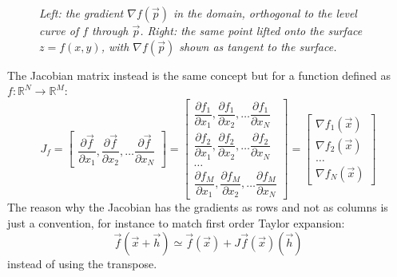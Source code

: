 \documentclass[12pt,a4paper]{article}
\begin{document}
\begin{figure}[htbp]
	\caption{\textit{Left: the gradient $\nabla f(\vec p)$ in the domain, orthogonal to the level curve of $f$ through $\vec p$. Right: the same point lifted onto the surface $z=f(x,y)$, with $\nabla f(\vec p)$ shown as tangent to the surface.}}
\end{figure}

The Jacobian matrix instead is the same concept but for a function defined as $f : \mathbb{R}^N \to \mathbb{R}^M$:
\begin{equation*}
	J_f = \begin{bmatrix}
		\dfrac{\partial \vec{f}}{\partial x_1}, \dfrac{\partial \vec{f}}{\partial x_2}, \dots \dfrac{\partial \vec{f}}{\partial x_N}
	\end{bmatrix} = 
	\begin{bmatrix}
		\dfrac{\partial f_1}{\partial x_1}, \dfrac{\partial f_1}{\partial x_2}, \dots \dfrac{\partial f_1}{\partial x_N} \\[12pt]
		\dfrac{\partial f_2}{\partial x_1}, \dfrac{\partial f_2}{\partial x_2}, \dots \dfrac{\partial f_2}{\partial x_N} \\[12pt]
		\dots\\[12pt]
		\dfrac{\partial f_M}{\partial x_1}, \dfrac{\partial f_M}{\partial x_2}, \dots \dfrac{\partial f_M}{\partial x_N}
	\end{bmatrix} = \begin{bmatrix}
	\nabla f_1(\vec{x}) \\[12pt]
	\nabla f_2(\vec{x}) \\[12pt]
	\dots \\[12pt]
	\nabla f_N(\vec{x})
	\end{bmatrix}
\end{equation*}
The reason why the Jacobian has the gradients as rows and not as columns is just a convention, for instance to match first order Taylor expansion:
\begin{equation*}
	\vec{f}(\vec{x}+\vec{h}) \simeq \vec{f}(\vec{x}) + J\vec{f}(\vec{x})(\vec{h})
\end{equation*}
instead of using the transpose.
\end{document}
